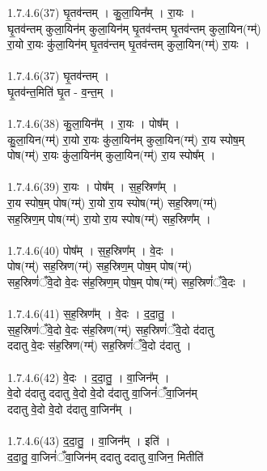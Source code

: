 \subsubsection{}
1.7.4.6(37)  घृ॒तव॑न्तम् । कु॒ला॒यिन᳚म् । रा॒यः ।\\
घृ॒तव॑न्तम् कुला॒यिन॑म् कुला॒यिन॑म् घृ॒तव॑न्तम् घृ॒तव॑न्तम् कुला॒यिन(ग्म्॑)\\
रा॒यो रा॒यः कु॑ला॒यिन॑म् घृ॒तव॑न्तम् घृ॒तव॑न्तम् कुला॒यिन(ग्म्॑) रा॒यः ।\\
\\
1.7.4.6(37)  घृ॒तव॑न्तम् ।\\
घृ॒तव॑न्त॒मिति॑ घृ॒त - व॒न्त॒म् ।\\
\\
1.7.4.6(38)  कु॒ला॒यिन᳚म् । रा॒यः । पोष᳚म् ।\\
कु॒ला॒यिन(ग्म्॑) रा॒यो रा॒यः कु॑ला॒यिन॑म् कुला॒यिन(ग्म्॑) रा॒य स्पोष॒म् \\
पोष(ग्म्॑) रा॒यः कु॑ला॒यिन॑म् कुला॒यिन(ग्म्॑) रा॒य स्पोष᳚म् ।\\
\\
1.7.4.6(39)  रा॒यः । पोष᳚म् । स॒ह॒स्रिण᳚म् ।\\
रा॒य स्पोष॒म् पोष(ग्म्॑) रा॒यो रा॒य स्पोष(ग्म्॑) सह॒स्रिण(ग्म्॑) \\
सह॒स्रिण॒म् पोष(ग्म्॑) रा॒यो रा॒य स्पोष(ग्म्॑) सह॒स्रिण᳚म् ।\\
\\
1.7.4.6(40)  पोष᳚म् । स॒ह॒स्रिण᳚म् । वे॒दः ।\\
पोष(ग्म्॑) सह॒स्रिण(ग्म्॑) सह॒स्रिण॒म् पोष॒म् पोष(ग्म्॑) \\
सह॒स्रिणं॑ँवे॒दो वे॒दः स॑ह॒स्रिण॒म् पोष॒म् पोष(ग्म्॑) सह॒स्रिणं॑ँवे॒दः ।\\
\\
1.7.4.6(41)  स॒ह॒स्रिण᳚म् । वे॒दः । द॒दा॒तु॒ ।\\
स॒ह॒स्रिणं॑ँवे॒दो वे॒दः स॑ह॒स्रिण(ग्म्॑) सह॒स्रिणं॑ँवे॒दो द॑दातु\\
ददातु वे॒दः स॑ह॒स्रिण(ग्म्॑) सह॒स्रिणं॑ँवे॒दो द॑दातु ।\\
\\
1.7.4.6(42)  वे॒दः । द॒दा॒तु॒ । वा॒जिन᳚म् ।\\
वे॒दो द॑दातु ददातु वे॒दो वे॒दो द॑दातु वा॒जिनं॑ँवा॒जिन॑म् \\
ददातु वे॒दो वे॒दो द॑दातु वा॒जिन᳚म् ।\\
\\
1.7.4.6(43)  द॒दा॒तु॒ । वा॒जिन᳚म् । इति॑ ।\\
द॒दा॒तु॒ वा॒जिनं॑ँवा॒जिन॑म् ददातु ददातु वा॒जिन॒ मितीति॑ \\

